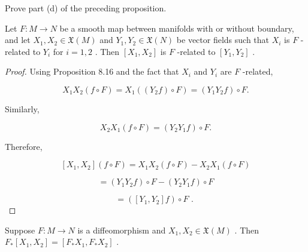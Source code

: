 \begin{exercise}
\label{exer:8-29}
\leanok
{}
Prove part (d) of the preceding proposition.
\end{exercise}

\begin{proposition}
\label{prop:8-30}
\leanok
{}
Let $F : M \rightarrow  N$ be a smooth map between manifolds with or without boundary, and let ${X}_{1},{X}_{2} \in  \mathfrak{X}\left( M\right)$ and ${Y}_{1},{Y}_{2} \in  \mathfrak{X}\left( N\right)$ be vector fields such that ${X}_{i}$ is $F$ -related to ${Y}_{i}$ for $i = 1,2$ . Then $\left\lbrack  {{X}_{1},{X}_{2}}\right\rbrack$ is $F$ -related to $\left\lbrack  {{Y}_{1},{Y}_{2}}\right\rbrack$ .
\end{proposition}

\begin{proof}
\leanok
Using Proposition 8.16 and the fact that ${X}_{i}$ and ${Y}_{i}$ are $F$ -related,

\[
{X}_{1}{X}_{2}\left( {f \circ  F}\right)  = {X}_{1}\left( {\left( {{Y}_{2}f}\right)  \circ  F}\right)  = \left( {{Y}_{1}{Y}_{2}f}\right)  \circ  F.
\]

Similarly,

\[
{X}_{2}{X}_{1}\left( {f \circ  F}\right)  = \left( {{Y}_{2}{Y}_{1}f}\right)  \circ  F.
\]

Therefore,

\[
\left\lbrack  {{X}_{1},{X}_{2}}\right\rbrack  \left( {f \circ  F}\right)  = {X}_{1}{X}_{2}\left( {f \circ  F}\right)  - {X}_{2}{X}_{1}\left( {f \circ  F}\right)
\]

\[
= \left( {{Y}_{1}{Y}_{2}f}\right)  \circ  F - \left( {{Y}_{2}{Y}_{1}f}\right)  \circ  F
\]

\[
= \left( {\left\lbrack  {{Y}_{1},{Y}_{2}}\right\rbrack  f}\right)  \circ  F\text{ . }
\]
\end{proof}

\begin{corollary}
\label{cor:8-31}
\leanok
{}
Suppose $F : M \rightarrow  N$ is a diffeomorphism and ${X}_{1},{X}_{2} \in  \mathfrak{X}\left( M\right)$ . Then ${F}_{ * }\left\lbrack  {{X}_{1},{X}_{2}}\right\rbrack   = \left\lbrack  {{F}_{ * }{X}_{1},{F}_{ * }{X}_{2}}\right\rbrack$ .
\end{corollary}


